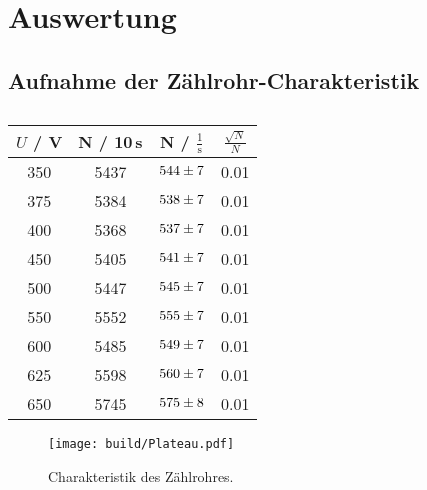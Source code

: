 \section{Auswertung}
\label{sec:Auswertung}

\subsection{Aufnahme der Zählrohr-Charakteristik}

\begin{table}[H]
  \centering
  \begin{tabular}{c|c|c|c}
    \hline
    $U$ / V & N / 10\,s & N / $\frac{1}{\text{s}}$ & $\frac{\sqrt{N}}{N}$ \\
    \hline
    350 & 5437 & $\num{544 +- 7}$ & 0.01 \\
    375 & 5384 & $\num{538 +- 7}$ & 0.01 \\
    400 & 5368 & $\num{537 +- 7}$ & 0.01 \\
    450 & 5405 & $\num{541 +- 7}$ & 0.01 \\
    500 & 5447 & $\num{545 +- 7}$ & 0.01 \\
    550 & 5552 & $\num{555 +- 7}$ & 0.01 \\
    600 & 5485 & $\num{549 +- 7}$ & 0.01 \\
    625 & 5598 & $\num{560 +- 7}$ & 0.01 \\
    650 & 5745 & $\num{575 +- 8}$ & 0.01 \\
  \end{tabular}
  \caption{}
  \label{tab:}
\end{table}

\begin{figure}[H]
  \centering
  \texttt{[image: build/Plateau.pdf]}
  \caption{Charakteristik des Zählrohres.}
  \label{fig:Plateau}
\end{figure}

